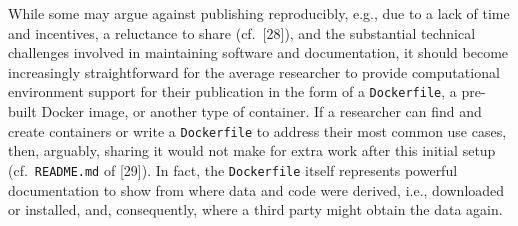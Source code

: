\documentclass[10pt,letterpaper]{article}
\begin{document}
While some may argue against publishing reproducibly, e.g., due to a
lack of time and incentives, a reluctance to share (cf.~{[}28{]}), and
the substantial technical challenges involved in maintaining software
and documentation, it should become increasingly straightforward for the
average researcher to provide computational environment support for
their publication in the form of a \texttt{Dockerfile}, a pre-built
Docker image, or another type of container. If a researcher can find and
create containers or write a \texttt{Dockerfile} to address their most
common use cases, then, arguably, sharing it would not make for extra
work after this initial setup (cf.~\texttt{README.md} of {[}29{]}). In
fact, the \texttt{Dockerfile} itself represents powerful documentation
to show from where data and code were derived, i.e., downloaded or
installed, and, consequently, where a third party might obtain the data
again.

\scriptsize
\end{document}
